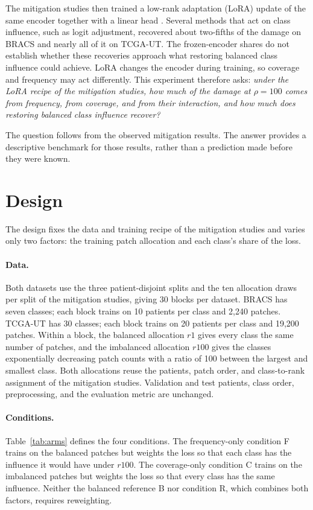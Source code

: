 \documentclass[11pt]{article}
\begin{document}
The mitigation studies then trained a low-rank adaptation (LoRA) update \citep{hu2022lora} of the same encoder together with a linear head \citep{queisler2026mitigationMethods,queisler2026mitigationBracs,queisler2026mitigationTcga}. Several methods that act on class influence, such as logit adjustment, recovered about two-fifths of the damage on BRACS and nearly all of it on TCGA-UT. The frozen-encoder shares do not establish whether these recoveries approach what restoring balanced class influence could achieve. LoRA changes the encoder during training, so coverage and frequency may act differently. This experiment therefore asks: \emph{under the LoRA recipe of the mitigation studies, how much of the damage at $\rho=100$ comes from frequency, from coverage, and from their interaction, and how much does restoring balanced class influence recover?}

The question follows from the observed mitigation results. The answer provides a descriptive benchmark for those results, rather than a prediction made before they were known.

\section{Design}
\label{sec:design}
The design fixes the data and training recipe of the mitigation studies and varies only two factors: the training patch allocation and each class's share of the loss.

\paragraph{Data.} Both datasets use the three patient-disjoint splits and the ten allocation draws per split of the mitigation studies, giving 30 blocks per dataset. BRACS \citep{brancati2022bracs} has seven classes; each block trains on 10 patients per class and 2,240 patches. TCGA-UT \citep{komura2022universalEncoding} has 30 classes; each block trains on 20 patients per class and 19,200 patches. Within a block, the balanced allocation $r1$ gives every class the same number of patches, and the imbalanced allocation $r100$ gives the classes exponentially decreasing patch counts with a ratio of 100 between the largest and smallest class. Both allocations reuse the patients, patch order, and class-to-rank assignment of the mitigation studies. Validation and test patients, class order, preprocessing, and the evaluation metric are unchanged.

\paragraph{Conditions.} Table~\ref{tab:arms} defines the four conditions. The frequency-only condition F trains on the balanced patches but weights the loss so that each class has the influence it would have under $r100$. The coverage-only condition C trains on the imbalanced patches but weights the loss so that every class has the same influence. Neither the balanced reference B nor condition R, which combines both factors, requires reweighting.
\end{document}
